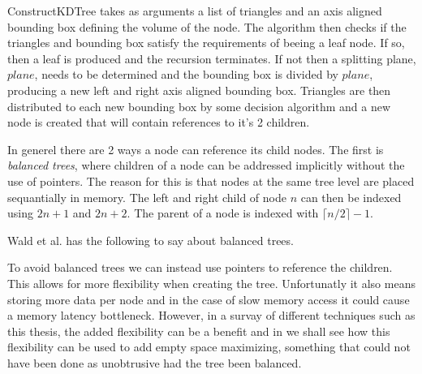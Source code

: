 ConstructKDTree takes as arguments a list of triangles and an axis
aligned bounding box defining the volume of the node. The algorithm
then checks if the triangles and bounding box satisfy the requirements
of beeing a leaf node. If so, then a leaf is produced and the
recursion terminates. If not then a splitting plane, $plane$, needs to
be determined and the bounding box is divided by $plane$, producing a
new left and right axis aligned bounding box. Triangles are then
distributed to each new bounding box by some decision algorithm and a
new node is created that will contain references to it's 2 children.



In generel there are 2 ways a node can reference its child nodes. The
first is \textit{balanced trees}, where children of a node can be
addressed implicitly without the use of pointers. The reason for this
is that nodes at the same tree level are placed sequantially in
memory. The left and right child of node $n$ can then be indexed using
$2n+1$ and $2n+2$. The parent of a node is indexed with $\lceil n/2
\rceil - 1$.


Wald et al. has the following to say about
balanced trees.



To avoid balanced trees we can instead use pointers to reference the
children. This allows for more flexibility when creating the tree.
Unfortunatly it also means storing more data per node and in the case
of slow memory access it could cause a memory latency
bottleneck. However, in a survay of different techniques such as this
thesis, the added flexibility can be a benefit and in
 we shall see how this flexibility can
be used to add empty space maximizing, something that could not have
been done as unobtrusive had the tree been balanced.




